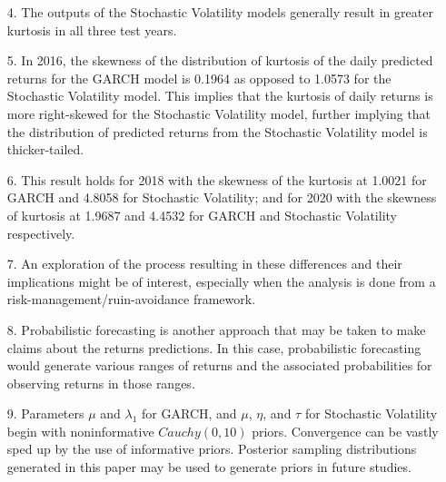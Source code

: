 \documentclass[11pt]{beamer}
\begin{document}
\begin{frame}

\begin{enumerate}
\item[4.] The outputs of the Stochastic Volatility models generally result in greater kurtosis in all three test years. 

\item[5.] In 2016, the skewness of the distribution of kurtosis of the daily predicted returns for the GARCH model is 0.1964 as opposed to 1.0573 for the Stochastic Volatility model. This implies that the kurtosis of daily returns is more right-skewed for the Stochastic Volatility model, further implying that the distribution of predicted returns from the Stochastic Volatility model is thicker-tailed. 

\item[6.] This result holds for 2018 with the skewness of the kurtosis at 1.0021 for GARCH and 4.8058 for Stochastic Volatility; and for 2020 with the skewness of kurtosis at 1.9687 and 4.4532 for GARCH and Stochastic Volatility respectively.

\item[7.] An exploration of  the process resulting in these differences and their implications might be of interest, especially when the analysis is done from a risk-management/ruin-avoidance framework.
\end{enumerate}
\end{frame}

\begin{frame}
\begin{enumerate}
\item[8.] Probabilistic forecasting is another approach that may be taken to make claims about the returns predictions. In this case, probabilistic forecasting would generate various ranges of returns and the associated probabilities for observing returns in those ranges.

\item[9.] Parameters $\mu$ and $\lambda_1$ for GARCH, and $\mu$, $\eta$, and $\tau$ for Stochastic Volatility begin with noninformative $Cauchy(0,10)$ priors. Convergence can be vastly sped up by the use of informative priors. Posterior sampling distributions generated in this paper may be used to generate priors in future studies.
\end{enumerate}
\end{frame}
\end{document}
